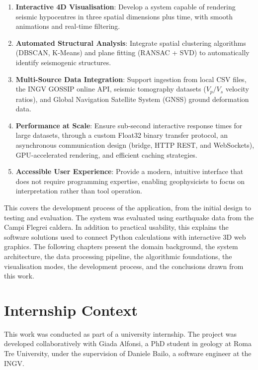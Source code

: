 \begin{enumerate}
    \item \textbf{Interactive 4D Visualisation}: Develop a system capable of rendering seismic hypocentres in three spatial dimensions plus time, with smooth animations and real-time filtering.

    \item \textbf{Automated Structural Analysis}: Integrate spatial clustering algorithms (DBSCAN, K-Means) and plane fitting (RANSAC + SVD) to automatically identify seismogenic structures.

    \item \textbf{Multi-Source Data Integration}: Support ingestion from local CSV files, the INGV GOSSIP online API, seismic tomography datasets ($V_p/V_s$ velocity ratios), and Global Navigation Satellite System (GNSS) ground deformation data.

    \item \textbf{Performance at Scale}: Ensure sub-second interactive response times for large datasets, through a custom Float32 binary transfer protocol, an asynchronous communication design (bridge, HTTP REST, and WebSockets), GPU-accelerated rendering, and efficient caching strategies.

    \item \textbf{Accessible User Experience}: Provide a modern, intuitive interface that does not require programming expertise, enabling geophysicists to focus on interpretation rather than tool operation.
\end{enumerate}

This  covers the development process of the application, from the initial design to testing and evaluation. The system was evaluated using earthquake data from the Campi Flegrei caldera. In addition to practical usability, this  explains the software solutions used to connect Python calculations with interactive 3D web graphics. The following chapters present the domain background, the system architecture, the data processing pipeline, the algorithmic foundations, the visualisation modes, the development process, and the conclusions drawn from this work.

\section{Internship Context}
\label{sec:internship}

This work was conducted as part of a university internship. The project was developed collaboratively with Giada Alfonsi, a PhD student in geology at Roma Tre University, under the supervision of Daniele Bailo, a software engineer at the INGV.

